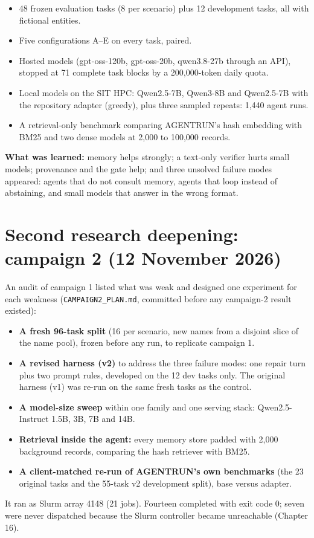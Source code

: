 \documentclass[10.5pt,a4paper,oneside]{report}
\begin{document}
\begin{itemize}
\item 48 frozen evaluation tasks (8 per scenario) plus 12 development tasks, all with fictional entities.
\item Five configurations A–E on every task, paired.
\item Hosted models (gpt-oss-120b, gpt-oss-20b, qwen3.8-27b through an API), stopped at 71 complete task blocks by a 200,000-token daily quota.
\item Local models on the SIT HPC: Qwen2.5-7B, Qwen3-8B and Qwen2.5-7B with the repository adapter (greedy), plus three sampled repeats: 1,440 agent runs.
\item A retrieval-only benchmark comparing AGENTRUN's hash embedding with BM25 and two dense models at 2,000 to 100,000 records.
\end{itemize}
\textbf{What was learned:} memory helps strongly; a text-only verifier hurts small models; provenance and the gate help; and three unsolved failure modes appeared: agents that do not consult memory, agents that loop instead of abstaining, and small models that answer in the wrong format.

\section{Second research deepening: campaign 2 (12 November 2026)}
An audit of campaign 1 listed what was weak and designed one experiment for each weakness (\texttt{CAMPAIGN2\_\allowbreak{}PLAN.\allowbreak{}md}, committed before any campaign-2 result existed):

\begin{itemize}
\item \textbf{A fresh 96-task split} (16 per scenario, new names from a disjoint slice of the name pool), frozen before any run, to replicate campaign 1.
\item \textbf{A revised harness (v2)} to address the three failure modes: one repair turn plus two prompt rules, developed on the 12 dev tasks only. The original harness (v1) was re-run on the same fresh tasks as the control.
\item \textbf{A model-size sweep} within one family and one serving stack: Qwen2.5-Instruct 1.5B, 3B, 7B and 14B.
\item \textbf{Retrieval inside the agent:} every memory store padded with 2,000 background records, comparing the hash retriever with BM25.
\item \textbf{A client-matched re-run of AGENTRUN's own benchmarks} (the 23 original tasks and the 55-task v2 development split), base versus adapter.
\end{itemize}
It ran as Slurm array 4148 (21 jobs). Fourteen completed with exit code 0; seven were never dispatched because the Slurm controller became unreachable (Chapter 16).
\end{document}
